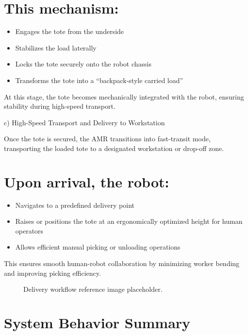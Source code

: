 \section*{This mechanism:}

\begin{itemize}
    \item Engages the tote from the underside
    \item Stabilizes the load laterally
    \item Locks the tote securely onto the robot chassis
    \item Transforms the tote into a ``backpack-style carried load''
\end{itemize}

At this stage, the tote becomes mechanically integrated with the robot, ensuring stability during high-speed transport.

c) High-Speed Transport and Delivery to Workstation

Once the tote is secured, the AMR transitions into fast-transit mode, transporting the loaded tote to a designated workstation or drop-off zone.

\section*{Upon arrival, the robot:}

\begin{itemize}
    \item Navigates to a predefined delivery point
    \item Raises or positions the tote at an ergonomically optimized height for human
operators

    \item Allows efficient manual picking or unloading operations
\end{itemize}

This ensures smooth human-robot collaboration by minimizing worker bending and improving picking efficiency.

\begin{figure}[H]
\centering
{}
\caption{Delivery workflow reference image placeholder.}
\end{figure}

\section*{System Behavior Summary}

